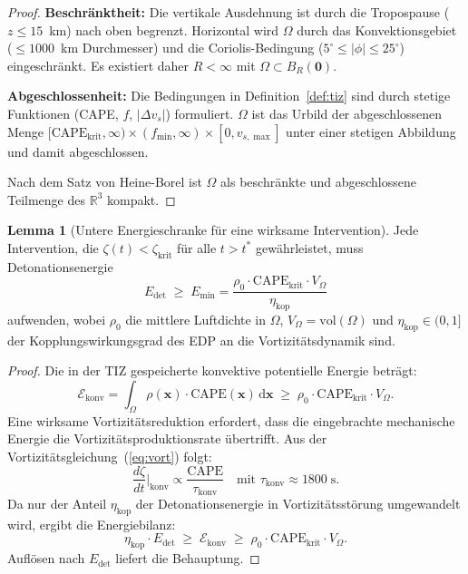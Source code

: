﻿\documentclass[a4paper,12pt]{article}
\theoremstyle{definition}
\newtheorem{lemma}{Lemma}
\begin{document}
\begin{proof}
\textbf{Beschr\"{a}nktheit:}
Die vertikale Ausdehnung ist durch die Tropospause ($z\leq 15$~km) nach oben begrenzt.
Horizontal wird $\Omega$ durch das Konvektionsgebiet ($\leq 1000$~km Durchmesser)
und die Coriolis-Bedingung ($5^{\circ}\leq|\phi|\leq 25^{\circ}$) eingeschr\"{a}nkt.
Es existiert daher $R<\infty$ mit $\Omega\subset B_{R}(\mathbf{0})$.

\textbf{Abgeschlossenheit:}
Die Bedingungen in Definition~\ref{def:tiz} sind durch stetige Funktionen
(CAPE, $f$, $|\Delta v_{s}|$) formuliert.
$\Omega$ ist das Urbild der abgeschlossenen Menge
$[\mathrm{CAPE}_{\mathrm{krit}},\infty)\times(f_{\min},\infty)\times[0,v_{s,\max}]$
unter einer stetigen Abbildung und damit abgeschlossen.

Nach dem Satz von Heine-Borel ist $\Omega$ als beschr\"{a}nkte und
abgeschlossene Teilmenge des $\mathbb{R}^{3}$ kompakt.
\end{proof}

\begin{lemma}[Untere Energieschranke f\"{u}r eine wirksame Intervention]
\label{lem:emin}
Jede Intervention, die $\zeta(t)<\zeta_{\mathrm{krit}}$
f\"{u}r alle $t>t^{*}$ gew\"{a}hrleistet, muss Detonationsenergie
\[
    E_{\mathrm{det}}\;\geq\;E_{\min}
    =\frac{\rho_{0}\cdot\mathrm{CAPE}_{\mathrm{krit}}\cdot V_{\Omega}}{\eta_{\mathrm{kop}}}
\]
aufwenden, wobei $\rho_{0}$ die mittlere Luftdichte in $\Omega$,
$V_{\Omega}=\mathrm{vol}(\Omega)$ und $\eta_{\mathrm{kop}}\in(0,1]$
der Kopplungswirkungsgrad des EDP an die Vortizit\"{a}tsdynamik sind.
\end{lemma}

\begin{proof}
Die in der TIZ gespeicherte konvektive potentielle Energie betr\"{a}gt:
\[
    \mathcal{E}_{\mathrm{konv}}
    =\int_{\Omega}\rho(\mathbf{x})\cdot\mathrm{CAPE}(\mathbf{x})\,\mathrm{d}\mathbf{x}
    \;\geq\;\rho_{0}\cdot\mathrm{CAPE}_{\mathrm{krit}}\cdot V_{\Omega}.
\]
Eine wirksame Vortizit\"{a}tsreduktion erfordert, dass die eingebrachte mechanische
Energie die Vortizit\"{a}tsproduktionsrate \"{u}bertrifft.
Aus der Vortizit\"{a}tsgleichung~(\ref{eq:vort}) folgt:
\[
    \frac{d\zeta}{dt}\bigg|_{\mathrm{konv}}
    \propto\frac{\mathrm{CAPE}}{\tau_{\mathrm{konv}}}
    \quad\text{mit }\tau_{\mathrm{konv}}\approx 1800\;\mathrm{s}.
\]
Da nur der Anteil $\eta_{\mathrm{kop}}$ der Detonationsenergie in
Vortizit\"{a}tsst\"{o}rung umgewandelt wird, ergibt die Energiebilanz:
\[
    \eta_{\mathrm{kop}}\cdot E_{\mathrm{det}}
    \;\geq\;\mathcal{E}_{\mathrm{konv}}
    \;\geq\;\rho_{0}\cdot\mathrm{CAPE}_{\mathrm{krit}}\cdot V_{\Omega}.
\]
Aufl\"{o}sen nach $E_{\mathrm{det}}$ liefert die Behauptung.
\end{proof}
\end{document}
